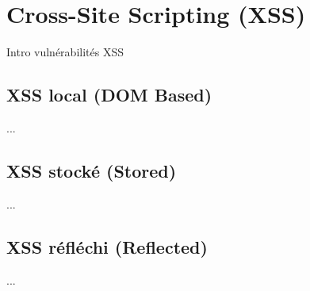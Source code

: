 

\section{Cross-Site Scripting (XSS)}\label{vulnerabilites:web:xss}

Intro vulnérabilités XSS

\subsection{XSS local (DOM Based)}\label{vulnerabilites:web:xss:dom}

...

\subsection{XSS stocké (Stored)}\label{vulnerabilites:web:xss:stored}

...

\subsection{XSS réfléchi (Reflected)}\label{vulnerabilites:web:xss:reflected}

...

\endinput
